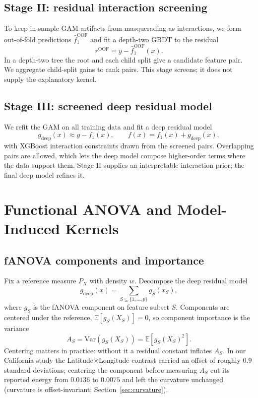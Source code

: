 \documentclass[11pt]{article}
\newcommand{\E}{\mathbb{E}}
\begin{document}
\subsection{Stage II: residual interaction screening}

To keep in-sample GAM artifacts from masquerading as interactions, we form
out-of-fold predictions $\hat f_1^{\mathrm{OOF}}$ and fit a depth-two GBDT to the
residual
\begin{equation}
 r^{\mathrm{OOF}}=y-\hat f_1^{\mathrm{OOF}}(x).
\end{equation}
In a depth-two tree the root and each child split give a candidate feature pair.
We aggregate child-split gains to rank pairs. This stage screens; it does not
supply the explanatory kernel.

\subsection{Stage III: screened deep residual model}

We refit the GAM on all training data and fit a deep residual model
\begin{equation}
 g_{\mathrm{deep}}(x)\approx y-f_1(x),
 \qquad
 f(x)=f_1(x)+g_{\mathrm{deep}}(x),
\end{equation}
with XGBoost interaction constraints drawn from the screened pairs. Overlapping
pairs are allowed, which lets the deep model compose higher-order terms where the
data support them. Stage II supplies an interpretable interaction prior; the
final deep model refines it.

\section{Functional ANOVA and Model-Induced Kernels}

\subsection{fANOVA components and importance}

Fix a reference measure $P_X$ with density $w$. Decompose the deep residual model
\begin{equation}
 g_{\mathrm{deep}}(x)=\sum_{S\subseteq\{1,\ldots,p\}}g_S(x_S),
\end{equation}
where $g_S$ is the fANOVA component on feature subset $S$. Components are centered
under the reference, $\E[g_S(X_S)]=0$, so component importance is the variance
\begin{equation}
 A_S=\mathrm{Var}\!\left(g_S(X_S)\right)=\E\!\left[g_S(X_S)^2\right].
\end{equation}
Centering matters in practice: without it a residual constant inflates
$A_S$. In our California study the Latitude$\times$Longitude contrast carried an
offset of roughly $0.9$ standard deviations; centering the component before
measuring $A_S$ cut its reported energy from $0.0136$ to $0.0075$ and left the
curvature unchanged (curvature is offset-invariant; Section~\ref{sec:curvature}).
\end{document}
